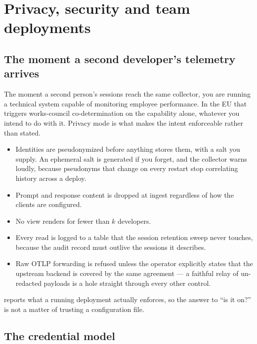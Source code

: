 \documentclass[11pt,a4paper]{article}
\newcommand{\code}[1]{\texttt{\detokenize{#1}}}
\begin{document}
\section{Privacy, security and team deployments}

\subsection{The moment a second developer's telemetry arrives}

The moment a second person's sessions reach the same collector, you are running
a technical system capable of monitoring employee performance. In the EU that
triggers works-council co-determination on the capability alone, whatever you
intend to do with it. Privacy mode is what makes the intent enforceable rather
than stated.

\begin{itemize}[leftmargin=*]
    \item Identities are pseudonymized before anything stores them, with a salt
    you supply. An ephemeral salt is generated if you forget, and the collector
    warns loudly, because pseudonyms that change on every restart stop
    correlating history across a deploy.
    \item Prompt and response content is dropped at ingest regardless of how the
    clients are configured.
    \item No view renders for fewer than $k$ developers.
    \item Every read is logged to a table that the session retention sweep never
    touches, because the audit record must outlive the sessions it describes.
    \item Raw OTLP forwarding is refused unless the operator explicitly states
    that the upstream backend is covered by the same agreement --- a faithful
    relay of un-redacted payloads is a hole straight through every other
    control.
\end{itemize}

\code{GET /api/privacy} reports what a running deployment actually enforces, so
the answer to ``is it on?'' is not a matter of trusting a configuration file.

\subsection{The credential model}
\end{document}
